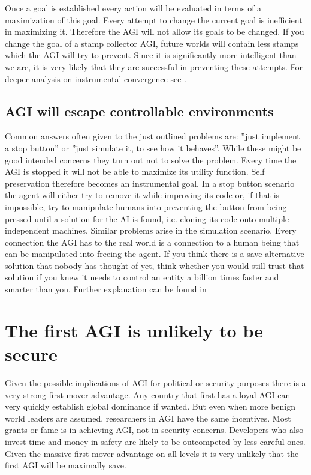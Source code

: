 \documentclass[conference]{IEEEtran}
\begin{document}
Once a goal is established every action will be evaluated in terms of a maximization of this goal. Every attempt to change the current goal is inefficient in maximizing it. Therefore the AGI will not allow its goals to be changed. If you change the goal of a stamp collector AGI, future worlds will contain less stamps which the AGI will try to prevent. Since it is significantly more intelligent than we are, it is very likely that they are successful in preventing these attempts. For deeper analysis on instrumental convergence see \cite{InstrumentalConvergenceMiles2018}.

\subsection{AGI will escape controllable environments}

Common answers often given to the just outlined problems are: ''just implement a stop button'' or ''just simulate it, to see how it behaves''. While these might be good intended concerns they turn out not to solve the problem. Every time the AGI is stopped it will not be able to maximize its utility function. Self preservation therefore becomes an instrumental goal. In a stop button scenario the agent will either try to remove it while improving its code or, if that is impossible, try to manipulate humans into preventing the button from being pressed until a solution for the AI is found, i.e. cloning its code onto multiple independent machines. Similar problems arise in the simulation scenario. Every connection the AGI has to the real world is a connection to a human being that can be manipulated into freeing the agent. If you think there is a save alternative solution that nobody has thought of yet, think whether you would still trust that solution if you knew it needs to control an entity a billion times faster and smarter than you. Further explanation can be found in \cite{StopButtonMiles2017}

\section{The first AGI is unlikely to be secure}
%
Given the possible implications of AGI for political or security purposes there is a very strong first mover advantage. Any country that first has a loyal AGI can very quickly establish global dominance if wanted. But even when more benign world leaders are assumed, researchers in AGI have the same incentives. Most grants or fame is in achieving AGI, not in security concerns. Developers who also invest time and money in safety are likely to be outcompeted by less careful ones. Given the massive first mover advantage on all levels it is very unlikely that the first AGI will be maximally save.
 
\end{document}
